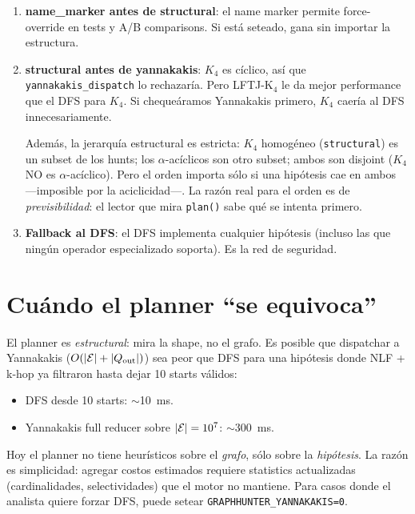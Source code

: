 \begin{enumerate}
    \item \textbf{name\_marker antes de structural}: el name marker
    permite force-override en tests y A/B comparisons. Si está
    seteado, gana sin importar la estructura.
    \item \textbf{structural antes de yannakakis}: \(K_4\) es
    cíclico, así que \texttt{yannakakis\_dispatch} lo rechazaría.
    Pero LFTJ-K\(_4\) le da mejor performance que el DFS para
    \(K_4\). Si chequeáramos Yannakakis primero, \(K_4\) caería al
    DFS innecesariamente.

    Además, la jerarquía estructural es estricta: \(K_4\)
    homogéneo (\texttt{structural}) es un subset de los hunts; los
    \(\alpha\)-acíclicos son otro subset; ambos son disjoint
    (\(K_4\) NO es \(\alpha\)-acíclico). Pero el orden importa
    sólo si una hipótesis cae en ambos ---imposible por la
    aciclicidad---. La razón real para el orden es de
    \emph{previsibilidad}: el lector que mira \texttt{plan()}
    sabe qué se intenta primero.
    \item \textbf{Fallback al DFS}: el DFS implementa cualquier
    hipótesis (incluso las que ningún operador especializado
    soporta). Es la red de seguridad.
\end{enumerate}

\section{Cuándo el planner ``se equivoca''}

El planner es \emph{estructural}: mira la shape, no el grafo. Es
posible que dispatchar a Yannakakis (\(O(|\mathcal{E}| + |Q_{\text{out}}|)\))
sea peor que DFS para una hipótesis donde NLF + k-hop ya filtraron
hasta dejar 10 starts válidos:

\begin{itemize}
    \item DFS desde 10 starts: $\sim$10~ms.
    \item Yannakakis full reducer sobre $|\mathcal{E}| = 10^7$: $\sim$300~ms.
\end{itemize}

\noindent
Hoy el planner no tiene heurísticos sobre el \emph{grafo}, sólo sobre
la \emph{hipótesis}. La razón es simplicidad: agregar costos
estimados requiere statistics actualizadas (cardinalidades,
selectividades) que el motor no mantiene. Para casos donde el
analista quiere forzar DFS, puede setear
\texttt{GRAPHHUNTER\_YANNAKAKIS=0}.

